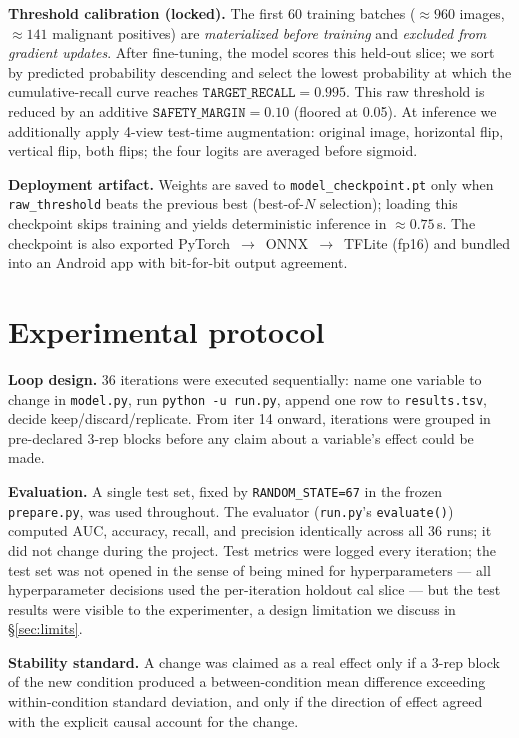 \documentclass{article}
\begin{document}
\textbf{Threshold calibration (locked).} The first 60 training batches
($\approx 960$ images, $\approx 141$ malignant positives) are
\emph{materialized before training} and \emph{excluded from gradient
updates}. After fine-tuning, the model scores this held-out slice; we
sort by predicted probability descending and select the lowest
probability at which the cumulative-recall curve reaches
$\texttt{TARGET\_RECALL}=0.995$. This raw threshold is reduced by an
additive $\texttt{SAFETY\_MARGIN}=0.10$ (floored at 0.05). At inference
we additionally apply 4-view test-time augmentation: original image,
horizontal flip, vertical flip, both flips; the four logits are averaged
before sigmoid.

\textbf{Deployment artifact.} Weights are saved to \texttt{model\_checkpoint.pt}
only when \texttt{raw\_threshold} beats the previous best (best-of-$N$
selection); loading this checkpoint skips training and yields deterministic
inference in $\approx 0.75$\,s. The checkpoint is also exported
PyTorch~$\to$~ONNX~$\to$~TFLite (fp16) and bundled into an Android app
with bit-for-bit output agreement.

\section{Experimental protocol}

\textbf{Loop design.} 36 iterations were executed sequentially: name one
variable to change in \texttt{model.py}, run \texttt{python -u run.py},
append one row to \texttt{results.tsv}, decide keep/discard/replicate.
From iter 14 onward, iterations were grouped in pre-declared 3-rep blocks
before any claim about a variable's effect could be made.

\textbf{Evaluation.} A single test set, fixed by \texttt{RANDOM\_STATE=67}
in the frozen \texttt{prepare.py}, was used throughout. The evaluator
(\texttt{run.py}'s \texttt{evaluate()}) computed AUC, accuracy, recall,
and precision identically across all 36 runs; it did not change during
the project. Test metrics were logged every iteration; the test set was
not opened in the sense of being mined for hyperparameters --- all
hyperparameter decisions used the per-iteration holdout cal slice ---
but the test results were visible to the experimenter, a design
limitation we discuss in \S\ref{sec:limits}.

\textbf{Stability standard.} A change was claimed as a real effect only
if a 3-rep block of the new condition produced a between-condition mean
difference exceeding within-condition standard deviation, and only if
the direction of effect agreed with the explicit causal account for
the change.
\end{document}
